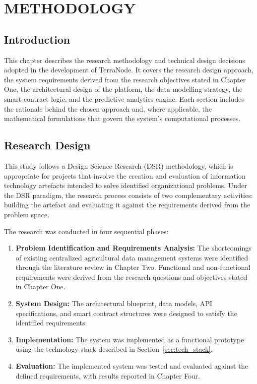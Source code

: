 \chapter{METHODOLOGY}

\section{Introduction}

This chapter describes the research methodology and technical design decisions adopted in the development of TerraNode. It covers the research design approach, the system requirements derived from the research objectives stated in Chapter One, the architectural design of the platform, the data modelling strategy, the smart contract logic, and the predictive analytics engine. Each section includes the rationale behind the chosen approach and, where applicable, the mathematical formulations that govern the system's computational processes.

\section{Research Design}

This study follows a Design Science Research (DSR) methodology, which is appropriate for projects that involve the creation and evaluation of information technology artefacts intended to solve identified organizational problems. Under the DSR paradigm, the research process consists of two complementary activities: building the artefact and evaluating it against the requirements derived from the problem space.

The research was conducted in four sequential phases:

\begin{enumerate}
    \item \textbf{Problem Identification and Requirements Analysis:} The shortcomings of existing centralized agricultural data management systems were identified through the literature review in Chapter Two. Functional and non-functional requirements were derived from the research questions and objectives stated in Chapter One.
    \item \textbf{System Design:} The architectural blueprint, data models, API specifications, and smart contract structures were designed to satisfy the identified requirements.
    \item \textbf{Implementation:} The system was implemented as a functional prototype using the technology stack described in Section~\ref{sec:tech_stack}.
    \item \textbf{Evaluation:} The implemented system was tested and evaluated against the defined requirements, with results reported in Chapter Four.
\end{enumerate}


